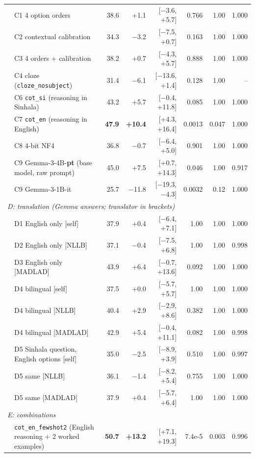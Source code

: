 \documentclass[10pt,a4paper]{article}
\newcommand{\best}[1]{\textbf{\textcolor{best}{#1}}}
\newcommand{\cond}[1]{\texttt{#1}}
\begin{document}
{\begin{longtable}{p{0.5ex}lrrrrrr}
& C1 4 option orders & 38.6 & +1.1 & [$-$3.6, +5.7] & 0.766 & 1.00 & 1.000\\
& C2 contextual calibration & 34.3 & $-$3.2 & [$-$7.5, +0.7] & 0.163 & 1.00 & 1.000\\
& C3 4 orders + calibration & 38.2 & +0.7 & [$-$4.3, +5.7] & 0.888 & 1.00 & 1.000\\
& C4 cloze (\cond{cloze\_nosubject}) & 31.4 & $-$6.1 & [$-$13.6, +1.4] & 0.128 & 1.00 & --\\
& C6 \cond{cot\_si} (reasoning in Sinhala) & 43.2 & +5.7 & [$-$0.4, +11.8] & 0.085 & 1.00 & 1.000\\
& C7 \cond{cot\_en} (reasoning in English) & \best{47.9} & \best{+10.4} & [+4.3, +16.4] & 0.0013 & 0.047 & 1.000\\
& C8 4-bit NF4 & 36.8 & $-$0.7 & [$-$6.4, +5.0] & 0.901 & 1.00 & 1.000\\
& C9 Gemma-3-4B-\textbf{pt} (base model, raw prompt) & 45.0 & +7.5 & [+0.7, +14.3] & 0.046 & 1.00 & 0.917\\
& C9 Gemma-3-1B-it & 25.7 & $-$11.8 & [$-$19.3, $-$4.3] & 0.0032 & 0.12 & 1.000\\
\multicolumn{8}{l}{\textit{D: translation (Gemma answers; translator in brackets)}}\\
& D1 English only [self] & 37.9 & +0.4 & [$-$6.4, +7.1] & 1.00 & 1.00 & 1.000\\
& D2 English only [NLLB] & 37.1 & $-$0.4 & [$-$7.5, +6.8] & 1.00 & 1.00 & 0.998\\
& D3 English only [MADLAD] & 43.9 & +6.4 & [$-$0.7, +13.6] & 0.092 & 1.00 & 1.000\\
& D4 bilingual [self] & 37.5 & +0.0 & [$-$5.7, +5.7] & 1.00 & 1.00 & 1.000\\
& D4 bilingual [NLLB] & 40.4 & +2.9 & [$-$2.9, +8.6] & 0.382 & 1.00 & 1.000\\
& D4 bilingual [MADLAD] & 42.9 & +5.4 & [$-$0.4, +11.1] & 0.082 & 1.00 & 0.998\\
& D5 Sinhala question, English options [self] & 35.0 & $-$2.5 & [$-$8.9, +3.9] & 0.510 & 1.00 & 0.997\\
& D5 same [NLLB] & 36.1 & $-$1.4 & [$-$8.2, +5.4] & 0.755 & 1.00 & 1.000\\
& D5 same [MADLAD] & 37.9 & +0.4 & [$-$5.7, +6.4] & 1.00 & 1.00 & 1.000\\
\multicolumn{8}{l}{\textit{E: combinations}}\\
& \cond{cot\_en\_fewshot2} (English reasoning + 2 worked examples) & \best{50.7} & \best{+13.2} & [+7.1, +19.3] & 7.4e-5 & 0.003 & 0.996\\

\end{longtable}}
\end{document}
